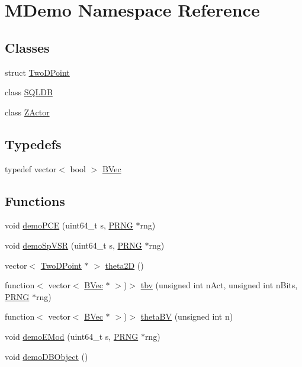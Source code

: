 \hypertarget{namespace_m_demo}{\section{M\-Demo Namespace Reference}
\label{namespace_m_demo}
}
\subsection*{Classes}
\begin{DoxyCompactItemize}
\item 
struct \hyperlink{struct_m_demo_1_1_two_d_point}{Two\-D\-Point}
\item 
class \hyperlink{class_m_demo_1_1_s_q_l_d_b}{S\-Q\-L\-D\-B}
\item 
class \hyperlink{class_m_demo_1_1_z_actor}{Z\-Actor}
\end{DoxyCompactItemize}
\subsection*{Typedefs}
\begin{DoxyCompactItemize}
\item 
typedef vector$<$ bool $>$ \hyperlink{namespace_m_demo_a3c7a072424bf3923b1f38e7eeac67730}{B\-Vec}
\end{DoxyCompactItemize}
\subsection*{Functions}
\begin{DoxyCompactItemize}
\item 
void \hyperlink{namespace_m_demo_ae028b254196c34299e3c028262099216}{demo\-P\-C\-E} (uint64\-\_\-t s, \hyperlink{class_k_base_1_1_p_r_n_g}{P\-R\-N\-G} $\ast$rng)
\item 
void \hyperlink{namespace_m_demo_aa44eeb6aa3294d138044a1bc558fab04}{demo\-Sp\-V\-S\-R} (uint64\-\_\-t s, \hyperlink{class_k_base_1_1_p_r_n_g}{P\-R\-N\-G} $\ast$rng)
\item 
vector$<$ \hyperlink{struct_m_demo_1_1_two_d_point}{Two\-D\-Point} $\ast$ $>$ \hyperlink{namespace_m_demo_a406eaf2c30862ef7a2b2de4084af5f60}{theta2\-D} ()
\item 
function$<$ vector$<$ \hyperlink{namespace_m_demo_a3c7a072424bf3923b1f38e7eeac67730}{B\-Vec} $\ast$ $>$)$>$ \hyperlink{namespace_m_demo_a741877f8618d8727b59f7453e50d2aff}{tbv} (unsigned int n\-Act, unsigned int n\-Bits, \hyperlink{class_k_base_1_1_p_r_n_g}{P\-R\-N\-G} $\ast$rng)
\item 
function$<$ vector$<$ \hyperlink{namespace_m_demo_a3c7a072424bf3923b1f38e7eeac67730}{B\-Vec} $\ast$ $>$)$>$ \hyperlink{namespace_m_demo_a6af3a411c8d1be9a4eda6cc155aa9229}{theta\-B\-V} (unsigned int n)
\item 
void \hyperlink{namespace_m_demo_a4b7fddd61fd83283df6057cc7d72ff85}{demo\-E\-Mod} (uint64\-\_\-t s, \hyperlink{class_k_base_1_1_p_r_n_g}{P\-R\-N\-G} $\ast$rng)
\item 
void \hyperlink{namespace_m_demo_aea6d8ad2d910cbfa54428f2652557b12}{demo\-D\-B\-Object} ()
\end{DoxyCompactItemize}


